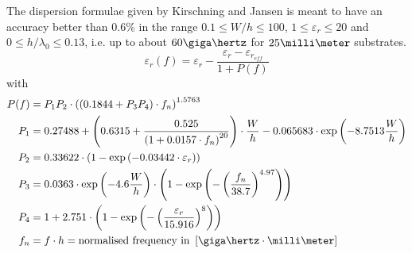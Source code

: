 The dispersion formulae given by Kirschning and Jansen
\cite{Kirschning3} is meant to have an accuracy better than 0.6\% in
the range $0.1 \le W/h \le 100$, $1\le \varepsilon_r \le 20$ and $0
\le h/\lambda_0 \le 0.13$, i.e. up to about $60\giga\hertz$ for
$25\milli\meter$ substrates.
\begin{equation}
\label{eq:KandJErEff_disp}
\varepsilon_{r}(f) = \varepsilon_{r} - \frac{\varepsilon_{r} - \varepsilon_{r_{eff}}}{1 + P(f)}
\end{equation}
with
\begin{align}
P(f) &= P_{1} P_{2} \cdot\left(\left(0.1844 + P_{3} P_{4}\right) \cdot f_{n}\right)^{1.5763}\\
P_{1} &= 0.27488 + \left(0.6315 + \frac{0.525}{\left(1 + 0.0157\cdot f_{n}\right)^{20}}\right)\cdot \frac{W}{h} - 0.065683 \cdot \exp\left(-8.7513\dfrac{W}{h}\right)\\
P_{2} &= 0.33622\cdot \left(1 - \exp\left(-0.03442 \cdot \varepsilon_{r}\right)\right)\\
P_{3} &= 0.0363 \cdot \exp\left(-4.6\dfrac{W}{h}\right) \cdot \left(1 - \exp\left(- \left(\dfrac{f_{n}}{38.7}\right)^{4.97}\right)\right)\\
P_{4} &= 1 + 2.751 \cdot \left(1 - \exp\left(- \left(\frac{\varepsilon_{r}}{15.916}\right)^{8}\right)\right)\\
\label{eq:KirschningFn}
f_{n} &= f \cdot h = \text{normalised frequency in } \left[\giga\hertz \cdot \milli\meter\right]
\end{align}

